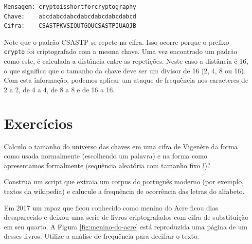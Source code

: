 \begin{example}
\begin{verbatim}
Mensagem: cryptoisshortforcryptography
Chave:    abcdabcdabcdabcdabcdabcdabcd
Cifra:    CSASTPKVSIQUTGQUCSASTPIUAQJB
\end{verbatim}  
\end{example}

Note que o padrão CSASTP se repete na cifra.
Isso ocorre porque o prefixo {\tt crypto} foi criptografado com a mesma chave.
Uma vez encontrado um padrão como este, é calculada a distância entre as repetições.
Neste caso a distância é 16, o que significa que o tamanho da chave deve ser um divisor de 16 (2, 4, 8 ou 16).
Com esta informação, podemos aplicar um ataque de frequência nos caracteres de 2 a 2, de 4 a 4, de 8 a 8 e de 16 a 16.

\section{Exercícios}
\label{sec:exercicios}


\begin{exercicio}
Calculo o tamanho do universo das chaves em uma cifra de Vigenère da forma como usada normalmente (escolhendo um palavra) e na forma como apresentamos formalmente (sequência aleatória com tamanho fixo $l$)?  
\end{exercicio}


\begin{exercicio}
Construa um script que extraia um corpus do português moderno (por exemplo, textos da wikipedia) e calucule a frequência de ocorrência das letras do alfabeto. 
\end{exercicio}

\begin{exercicio}
Em 2017 um rapaz que ficou conhecido como menino do Acre ficou dias desaparecido e deixou uma serie de livros criptografados com cifra de substituição em seu quarto.
A Figura \ref{fig:menino-do-acre} está reproduzida uma página de um desses livros. 
Utilize a análise de frequência para decifrar o texto.
\end{exercicio}

